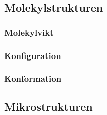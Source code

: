 \subsection{Molekylstrukturen}
\subsubsection{Molekylvikt}
\subsubsection{Konfiguration}
\subsubsection{Konformation}

\subsection{Mikrostrukturen}
